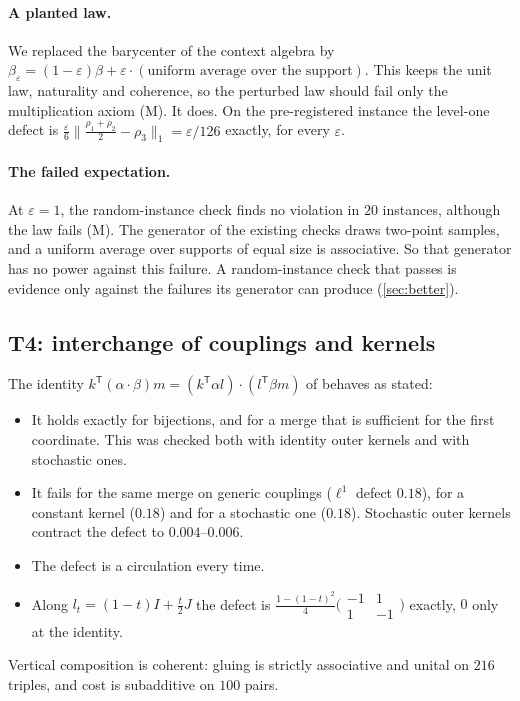 \documentclass[11pt]{article}
\theoremstyle{definition}
\theoremstyle{remark}
\begin{document}
\paragraph{A planted law.} We replaced the barycenter of the context algebra by
$\beta_\varepsilon=(1-\varepsilon)\beta+\varepsilon\cdot(\text{uniform average over the support})$. This keeps the unit law,
naturality and coherence, so the perturbed law should fail only the multiplication axiom (M). It does. On the pre-registered
instance the level-one defect is $\frac\varepsilon6\lVert\frac{\rho_1+\rho_2}2-\rho_3\rVert_1=\varepsilon/126$ exactly, for every
$\varepsilon$.

\paragraph{The failed expectation.} At $\varepsilon=1$, the random-instance check finds no violation in $20$ instances, although the
law fails (M). The generator of the existing checks draws two-point samples, and a uniform average over supports of equal size is
associative. So that generator has no power against this failure. A random-instance check that passes is evidence only against the
failures its generator can produce (\cref{sec:better}).

\subsection{T4: interchange of couplings and kernels}

The identity $k^{\mathsf T}(\alpha\cdot\beta)m=(k^{\mathsf T}\alpha l)\cdot(l^{\mathsf T}\beta m)$ of \cite[Prop.~6.1]{Algebras} behaves as stated:
\begin{itemize}[leftmargin=*,nosep]
\item It holds exactly for bijections, and for a merge that is sufficient for the first coordinate. This was checked both with identity
  outer kernels and with stochastic ones.
\item It fails for the same merge on generic couplings ($\ell^1$ defect $0.18$), for a constant kernel ($0.18$) and for a stochastic one
  ($0.18$). Stochastic outer kernels contract the defect to $0.004$--$0.006$.
\item The defect is a circulation every time.
\item Along $l_t=(1-t)I+\frac t2J$ the defect is $\frac{1-(1-t)^2}4\bigl(\begin{smallmatrix}-1&1\\1&-1\end{smallmatrix}\bigr)$ exactly,
  $0$ only at the identity.
\end{itemize}
Vertical composition is coherent: gluing is strictly associative and unital on $216$ triples, and cost is subadditive on $100$ pairs.
\end{document}

